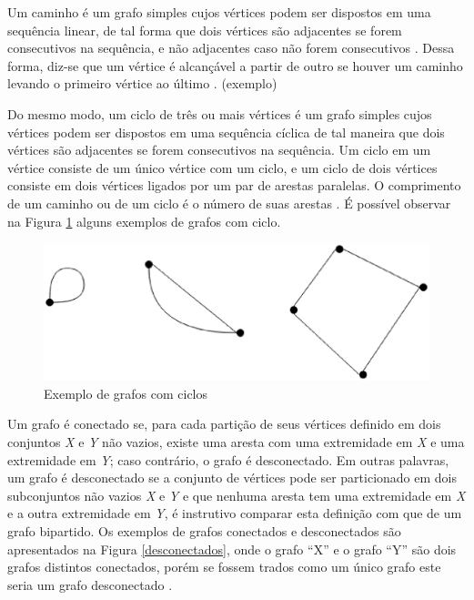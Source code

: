 Um caminho é um grafo simples cujos vértices podem ser dispostos em uma sequência linear, de tal forma que dois vértices são adjacentes se forem consecutivos na sequência, e não adjacentes caso não forem consecutivos \cite{Bondy:2007}. Dessa forma, diz-se que um vértice é alcançável a partir de outro se houver um caminho levando o primeiro vértice ao último \cite{Costa:2011}.
(exemplo)

Do mesmo modo, um ciclo de três ou mais vértices é um grafo simples cujos vértices podem ser dispostos em uma sequência cíclica de tal maneira que dois vértices são adjacentes se forem consecutivos na sequência. Um ciclo em um vértice consiste de um único vértice com um ciclo, e um ciclo de dois vértices consiste em dois vértices ligados por um par de arestas paralelas. O comprimento de um caminho ou de um ciclo é o número de suas arestas \cite{Costa:2011}. É possível observar na Figura \ref{ciclos} alguns exemplos de grafos com ciclo.

\begin{figure}[!h]
	\centering
	\includegraphics[scale=0.5]{figuras/capitulo1/ciclos.eps}
	\caption{Exemplo de grafos com ciclos}
	\label{ciclos}
\end{figure}

Um grafo é conectado se, para cada partição de seus vértices definido em dois conjuntos \textit{X} e \textit{Y} não vazios, existe uma aresta com uma extremidade em \textit{X} e uma extremidade em \textit{Y}; caso contrário, o grafo é desconectado. Em outras palavras, um grafo é desconectado se a conjunto de vértices pode ser particionado em dois subconjuntos não vazios \textit{X} e \textit{Y} e que nenhuma aresta tem uma extremidade em \textit{X} e a outra extremidade em \textit{Y}, é instrutivo comparar esta definição com que de um grafo bipartido. Os exemplos de grafos conectados e desconectados são apresentados na Figura \ref{desconectados}, onde o grafo ``X'' e o grafo ``Y'' são dois grafos distintos conectados, porém se fossem trados como um único grafo este seria um grafo desconectado \cite{Bondy:2007}.


